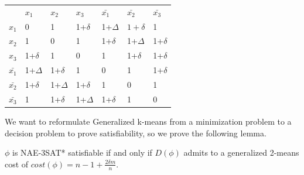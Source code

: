 \begin{table}[H]
\begin{tabular}{lllllll}
                       & $x_1$                      & $x_2 $                     & $x_3 $                    & $\bar{x_1}$                      & $\bar{x_2}$                      & $\bar{x_3}$                     \\ \cline{2-7} 
\multicolumn{1}{l|}{$x_1$} & \multicolumn{1}{l|}{0} & \multicolumn{1}{l|}{1}  & \multicolumn{1}{l|}{1+$\delta$}  & \multicolumn{1}{l|}{1+$\Delta$}  & \multicolumn{1}{l|}{$1+\delta$}  & \multicolumn{1}{l|}{1}  \\ \cline{2-7} 
\multicolumn{1}{l|}{$x_2$} & \multicolumn{1}{l|}{1}  & \multicolumn{1}{l|}{0} & \multicolumn{1}{l|}{1}  & \multicolumn{1}{l|}{1+$\delta$}  & \multicolumn{1}{l|}{1+$\Delta$}  & \multicolumn{1}{l|}{1+$\delta$}  \\ \cline{2-7} 
\multicolumn{1}{l|}{$x_3$} & \multicolumn{1}{l|}{1+$\delta$}  & \multicolumn{1}{l|}{1}  & \multicolumn{1}{l|}{0} & \multicolumn{1}{l|}{1}  & \multicolumn{1}{l|}{1+$\delta$}  & \multicolumn{1}{l|}{1+$\delta$}  \\ \cline{2-7} 
\multicolumn{1}{l|}{$\bar{x_1}$} & \multicolumn{1}{l|}{1+$\Delta$}  & \multicolumn{1}{l|}{1+$\delta$}  & \multicolumn{1}{l|}{1}  & \multicolumn{1}{l|}{0} & \multicolumn{1}{l|}{1}  & \multicolumn{1}{l|}{1+$\delta$}  \\ \cline{2-7} 
\multicolumn{1}{l|}{$\bar{x_2}$} & \multicolumn{1}{l|}{1+$\delta$}  & \multicolumn{1}{l|}{1+$\Delta$}  & \multicolumn{1}{l|}{1+$\delta$}  & \multicolumn{1}{l|}{1}  & \multicolumn{1}{l|}{0} & \multicolumn{1}{l|}{1}  \\ \cline{2-7} 
\multicolumn{1}{l|}{$\bar{x_3}$} & \multicolumn{1}{l|}{1}  & \multicolumn{1}{l|}{1+$\delta$}  & \multicolumn{1}{l|}{1+$\Delta$}  & \multicolumn{1}{l|}{1+$\delta$}  & \multicolumn{1}{l|}{1}  & \multicolumn{1}{l|}{0} \\ \cline{2-7} 

\end{tabular}

\end {table}

We want to reformulate Generalized k-means from a minimization problem to a decision problem to prove satisfiability, so we prove the following lemma.
\begin{lemma} \label{generalized-2-means-cost}
$\phi$ is NAE-3SAT* satisfiable if and only if $D(\phi)$ admits to a
generalized 2-means cost of $cost(\phi) = n - 1 + \frac{2\delta
  m}{n}$. 
\end{lemma}

